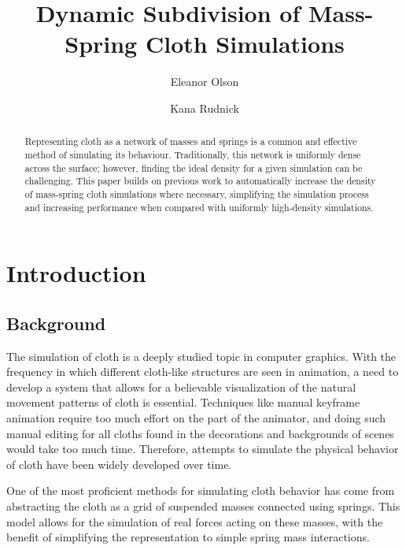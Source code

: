\documentclass[sigconf]{acmart}
\begin{document}
\title{Dynamic Subdivision of Mass-Spring Cloth Simulations}
\author{Eleanor Olson}
\author{Kana Rudnick}
\renewcommand\footnotetextcopyrightpermission[1]{}
\pagestyle{plain}

\begin{abstract}
Representing cloth as a network of masses and springs is a common and effective method of simulating its behaviour. Traditionally, this network is uniformly dense across the surface; however, finding the ideal density for a given simulation can be challenging. This paper builds on previous work to automatically increase the density of mass-spring cloth simulations where necessary, simplifying the simulation process and increasing performance when compared with uniformly high-density simulations.
\end{abstract}


\maketitle

\section{Introduction}
\subsection{Background}
The simulation of cloth is a deeply studied topic in computer graphics. With the frequency in which different
cloth-like structures are seen in animation, a need to develop a system that allows for a believable visualization
of the natural movement patterns of cloth is essential. Techniques like manual keyframe animation require too much effort
on the part of the animator, and doing such manual editing for all cloths found in the decorations and backgrounds of scenes
would take too much time. Therefore, attempts to simulate the physical behavior of cloth have been widely developed over time.

One of the most proficient methods for simulating cloth behavior has come from abstracting the cloth as a grid of
suspended masses connected using springs. This model allows for the simulation of real forces acting on these masses,
with the benefit of simplifying the representation to simple spring mass interactions. \cite{provot}
\end{document}
